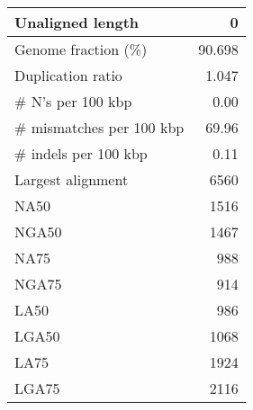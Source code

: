 \documentclass[12pt,a4paper]{article}
\begin{document}
\begin{table}[ht]
\begin{center}
\begin{tabular}{|l*{1}{|r}|}
Unaligned length & 0 \\ \hline
Genome fraction (\%) & 90.698 \\ \hline
Duplication ratio & 1.047 \\ \hline
\# N's per 100 kbp & 0.00 \\ \hline
\# mismatches per 100 kbp & 69.96 \\ \hline
\# indels per 100 kbp & 0.11 \\ \hline
Largest alignment & 6560 \\ \hline
NA50 & 1516 \\ \hline
NGA50 & 1467 \\ \hline
NA75 & 988 \\ \hline
NGA75 & 914 \\ \hline
LA50 & 986 \\ \hline
LGA50 & 1068 \\ \hline
LA75 & 1924 \\ \hline
LGA75 & 2116 \\ \hline
\end{tabular}
\end{center}
\end{table}
\end{document}
